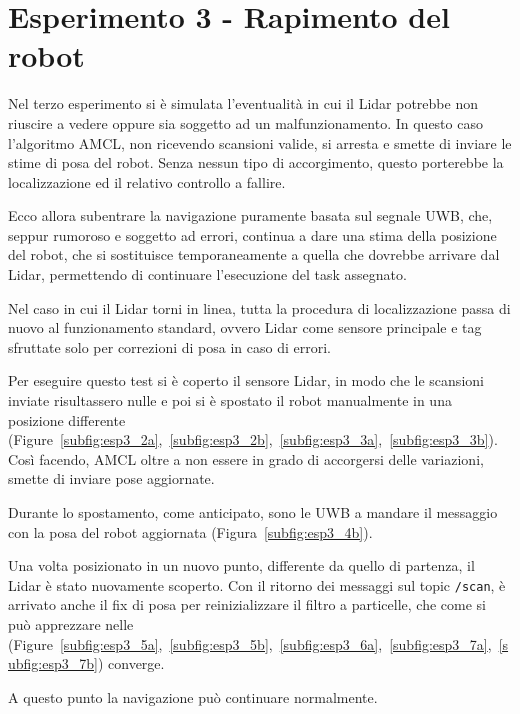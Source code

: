 \section{Esperimento 3 - Rapimento del robot}
\label{section3.3}
Nel terzo esperimento si è simulata l'eventualità in cui il Lidar potrebbe non riuscire a vedere oppure sia soggetto ad un malfunzionamento. In questo caso l'algoritmo AMCL, non ricevendo scansioni valide, si arresta e smette di inviare le stime di posa del robot. Senza nessun tipo di accorgimento, questo porterebbe la localizzazione ed il relativo controllo a fallire.

Ecco allora subentrare la navigazione puramente basata sul segnale UWB, che, seppur rumoroso e soggetto ad errori, continua a dare una stima della posizione del robot, che si sostituisce temporaneamente a quella che dovrebbe arrivare dal Lidar, permettendo di continuare l'esecuzione del task assegnato.

Nel caso in cui il Lidar torni in linea, tutta la procedura di localizzazione passa di nuovo al funzionamento standard, ovvero Lidar come sensore principale e tag sfruttate solo per correzioni di posa in caso di errori.

Per eseguire questo test si è coperto il sensore Lidar, in modo che le scansioni inviate risultassero nulle e poi si è spostato il robot manualmente in una posizione differente (Figure~\ref{subfig:esp3_2a},~\ref{subfig:esp3_2b},~\ref{subfig:esp3_3a},~\ref{subfig:esp3_3b}). Così facendo, AMCL oltre a non essere in grado di accorgersi delle variazioni, smette di inviare pose aggiornate. 

Durante lo spostamento, come anticipato, sono le UWB a mandare il messaggio con la posa del robot aggiornata (Figura~\ref{subfig:esp3_4b}).

Una volta posizionato in un nuovo punto, differente da quello di partenza, il Lidar è stato nuovamente scoperto. Con il ritorno dei messaggi sul topic \texttt{/scan}, è arrivato anche il fix di posa per reinizializzare il filtro a particelle, che come si può apprezzare nelle (Figure~\ref{subfig:esp3_5a},~\ref{subfig:esp3_5b},~\ref{subfig:esp3_6a},~\ref{subfig:esp3_7a},~\ref{subfig:esp3_7b}) converge.

A questo punto la navigazione può continuare normalmente.

